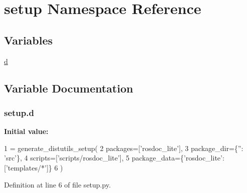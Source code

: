 \hypertarget{namespacesetup}{}\section{setup Namespace Reference}
\label{namespacesetup}
\subsection*{Variables}
\begin{DoxyCompactItemize}
\item 
\hyperlink{namespacesetup_aa2586b6c4dd84a0aaaf49cb1565cee6e}{d}
\end{DoxyCompactItemize}


\subsection{Variable Documentation}
\subsubsection[{\texorpdfstring{d}{d}}]{\setlength{\rightskip}{0pt plus 5cm}setup.\+d}\hypertarget{namespacesetup_aa2586b6c4dd84a0aaaf49cb1565cee6e}{}\label{namespacesetup_aa2586b6c4dd84a0aaaf49cb1565cee6e}
{\bfseries Initial value\+:}
\begin{DoxyCode}
1 = generate\_distutils\_setup(
2     packages=[\textcolor{stringliteral}{'rosdoc\_lite'}],
3     package\_dir=\{\textcolor{stringliteral}{''}: \textcolor{stringliteral}{'src'}\},
4     scripts=[\textcolor{stringliteral}{'scripts/rosdoc\_lite'}],
5     package\_data=\{\textcolor{stringliteral}{'rosdoc\_lite'}: [\textcolor{stringliteral}{'templates/*'}]\}
6 )
\end{DoxyCode}


Definition at line 6 of file setup.\+py.

